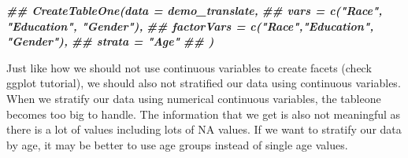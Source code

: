 \documentclass[
]{book}
\newenvironment{Shaded}{\begin{snugshade}}{\end{snugshade}}
\newcommand{\DocumentationTok}[1]{\textcolor[rgb]{0.56,0.35,0.01}{\textbf{\textit{#1}}}}
\begin{document}
\begin{Shaded}
\begin{Highlighting}[]
\DocumentationTok{\#\# CreateTableOne(data = demo\_translate,}
\DocumentationTok{\#\#               vars = c("Race", "Education", "Gender"),}
\DocumentationTok{\#\#               factorVars = c("Race","Education", "Gender"),}
\DocumentationTok{\#\#               strata = "Age"}
\DocumentationTok{\#\#              )}
\end{Highlighting}
\end{Shaded}

Just like how we should not use continuous variables to create facets (check ggplot tutorial), we should also not stratified our data using continuous variables. When we stratify our data using numerical continuous variables, the tableone becomes too big to handle. The information that we get is also not meaningful as there is a lot of values including lots of NA values. If we want to stratify our data by age, it may be better to use age groups instead of single age values.

  
\end{document}
